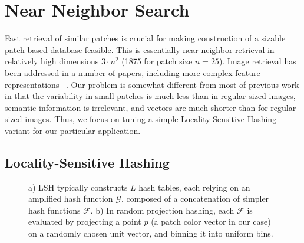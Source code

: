 \section{Near Neighbor Search}\label{sec:nn}

Fast retrieval of similar patches is crucial for making
construction of a sizable patch-based database feasible.
This is essentially near-neighbor retrieval in
relatively high dimensions $3 \cdot n^2$ (1875 for patch size $n=25$).
Image retrieval has been addressed in a number of papers,
including more complex feature representations ~\cite{perronnin2010large}.
Our problem is somewhat different from most of previous work
in that the variability
in small patches is much less than in regular-sized images,
semantic information is irrelevant, and vectors are much shorter
than for regular-sized images.
Thus, we focus on tuning a simple Locality-Sensitive Hashing variant for our
particular application.

\subsection{Locality-Sensitive Hashing}

\begin{figure}[ht!]
\centering
{}
\caption{a) LSH typically constructs
$L$ hash tables, each relying on an amplified
hash function $\mathcal{G}$, composed of a concatenation
of simpler hash functions $\mathcal{F}$. b) In
random projection hashing, each
$\mathcal{F}$ is evaluated by projecting a point $p$
(a patch color vector in our case) on a randomly chosen
unit vector, and binning it into uniform bins.}
\label{fig:lsh}
\end{figure}

